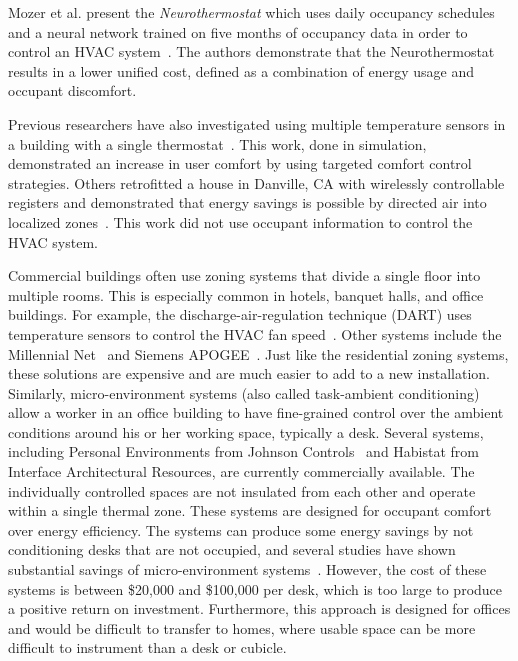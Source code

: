 Mozer et al. present the {\em Neurothermostat} which uses daily occupancy
schedules and a neural network trained on five months of occupancy data in order
to control an HVAC system~\cite{mozer1997neurothermostat}. The authors
demonstrate that the Neurothermostat results in a lower unified cost, defined as
a combination of energy usage and occupant discomfort. 

Previous researchers have also investigated using multiple temperature sensors
in a building with a single thermostat~\cite{lin2002multi}. This work, done in
simulation, demonstrated an increase in user comfort by using targeted comfort
control strategies. Others retrofitted a house in Danville, CA with wirelessly
controllable registers and demonstrated that energy savings is possible by
directed air into localized zones~\cite{watts2007application}. This work did not
use occupant information to control the HVAC system.


Commercial buildings often use zoning systems that divide a single floor into
multiple rooms.  This is especially common in hotels, banquet halls, and office
buildings.  For example, the discharge-air-regulation technique (DART) uses
temperature sensors to control the HVAC fan
speed~\cite{federspiel2006wireless}. Other systems include the Millennial
Net~\cite{Net2009} and Siemens APOGEE~\cite{Inc.2010}.  Just like the
residential zoning systems, these solutions are expensive and are much easier to
add to a new installation.  Similarly, micro-environment systems (also called
task-ambient conditioning) allow a worker in an office building to have
fine-grained control over the ambient conditions around his or her working
space, typically a desk. Several systems, including Personal Environments from
Johnson Controls~\cite{Controls2010} and Habistat from Interface Architectural
Resources, are currently commercially available. The individually controlled
spaces are not insulated from each other and operate within a single thermal
zone. These systems are designed for occupant comfort over energy efficiency.
The systems can produce some energy savings by not conditioning desks that are
not occupied, and several studies have shown substantial savings of
micro-environment systems~\cite{Airgonomix2008,rose1997epa,llc2002energy}.
However, the cost of these systems is between \$20,000 and \$100,000 per desk,
which is too large to produce a positive return on investment.  Furthermore,
this approach is designed for offices and would be difficult to transfer to
homes, where usable space can be more difficult to instrument than a desk or
cubicle.


